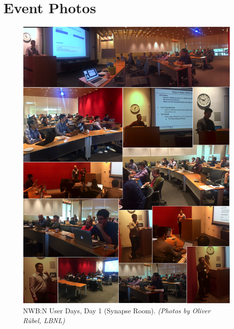 \documentclass{article}
\begin{document}
\clearpage
\section{Event Photos}

\begin{figure}[h!]
\includegraphics[width=\textwidth]{figures/photos_day1_main_room.png}
\caption{NWB:N User Days, Day 1 (Synapse Room). \textit{(Photos by Oliver R\"ubel, LBNL)}}
\end{figure}
\end{document}
